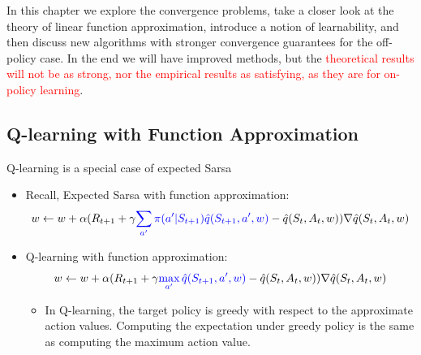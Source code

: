 \documentclass[12pt, a4paper]{article}
\begin{document}
In this chapter we explore the convergence problems, take a closer look at the theory of linear function approximation, introduce a notion of learnability, and then discuss new algorithms with stronger convergence guarantees for the off-policy case. In the end we will have improved methods, but the \textcolor{red}{theoretical results will not be as strong, nor the empirical results as satisfying, as they are for on-policy learning}.




\subsection{Q-learning with Function Approximation}\label{qlearning-with-function-approximation}



Q-learning is a special case of expected Sarsa


\begin{itemize}
  \item Recall, Expected Sarsa with function approximation:
  $$
  w \leftarrow w + \alpha (R_{t+1} + \gamma \textcolor{blue}{\sum_{a'} \pi(a' | S_{t+1}) \hat{q}(S_{t+1}, a',w)} - \hat{q}(S_t,A_t,w)) \nabla \hat{q}(S_t,A_t,w)
  $$
  \item Q-learning with function approximation:
  $$
  w \leftarrow w + \alpha (R_{t+1} + \gamma \textcolor{blue}{\max_{a'} \hat{q}(S_{t+1}, a',w)} - \hat{q}(S_t,A_t,w)) \nabla \hat{q}(S_t,A_t,w)
  $$
  \begin{itemize}
    \item In Q-learning, the target policy is greedy with respect to the approximate action values. Computing the expectation under greedy policy is the same as computing the maximum action value.
  \end{itemize}
\end{itemize}
\end{document}
